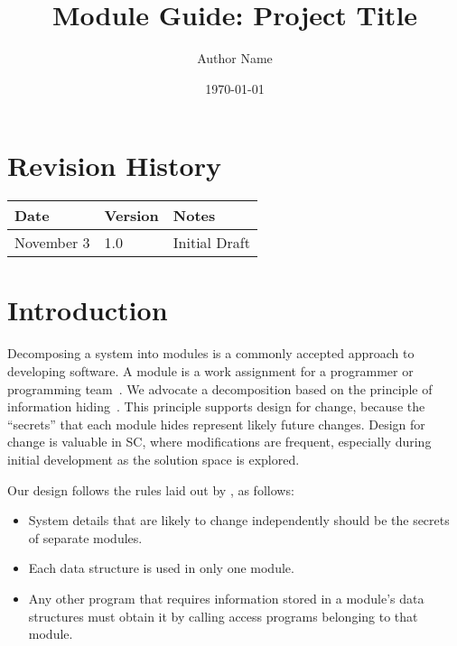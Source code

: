 \documentclass[12pt, titlepage]{article}
\begin{document}
\title{Module Guide: Project Title} 
\author{Author Name}
\date{\today}

\maketitle


\section{Revision History}

\begin{tabularx}{\textwidth}{p{3cm}p{2cm}X}
\toprule {\bf Date} & {\bf Version} & {\bf Notes}\\
\midrule
November 3 & 1.0 & Initial Draft\\
\bottomrule
\end{tabularx}

\newpage

\tableofcontents

\listoftables

\listoffigures

\newpage


\section{Introduction}

Decomposing a system into modules is a commonly accepted approach to developing
software.  A module is a work assignment for a programmer or programming
team~\citep{ParnasEtAl1984}.  We advocate a decomposition
based on the principle of information hiding~\citep{Parnas1972a}.  This
principle supports design for change, because the ``secrets'' that each module
hides represent likely future changes.  Design for change is valuable in SC,
where modifications are frequent, especially during initial development as the
solution space is explored.  

Our design follows the rules laid out by \citet{ParnasEtAl1984}, as follows:
\begin{itemize}
\item System details that are likely to change independently should be the
  secrets of separate modules.
\item Each data structure is used in only one module.
\item Any other program that requires information stored in a module's data
  structures must obtain it by calling access programs belonging to that module.
\end{itemize}
\end{document}

